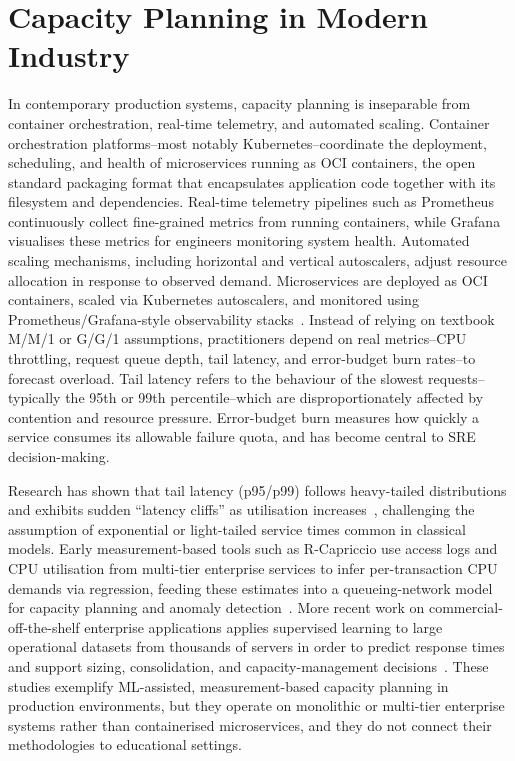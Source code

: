 \section{Capacity Planning in Modern Industry}

In contemporary production systems, capacity planning is inseparable from container orchestration, real-time telemetry, and automated scaling. Container orchestration platforms--most notably Kubernetes--coordinate the deployment, scheduling, and health of microservices running as OCI containers, the open standard packaging format that encapsulates application code together with its filesystem and dependencies. Real-time telemetry pipelines such as Prometheus continuously collect fine-grained metrics from running containers, while Grafana visualises these metrics for engineers monitoring system health. Automated scaling mechanisms, including horizontal and vertical autoscalers, adjust resource allocation in response to observed demand. Microservices are deployed as OCI containers, scaled via Kubernetes autoscalers, and monitored using Prometheus/Grafana-style observability stacks~\cite{Burns2016,GoogleSRE2020}. Instead of relying on textbook M/M/1 or G/G/1 assumptions, practitioners depend on real metrics--CPU throttling, request queue depth, tail latency, and error-budget burn rates--to forecast overload. Tail latency refers to the behaviour of the slowest requests--typically the 95th or 99th percentile--which are disproportionately affected by contention and resource pressure. Error-budget burn measures how quickly a service consumes its allowable failure quota, and has become central to SRE decision-making.

Research has shown that tail latency (p95/p99) follows heavy-tailed distributions and exhibits sudden ``latency cliffs'' as utilisation increases~\cite{DeanBarroso2013}, challenging the assumption of exponential or light-tailed service times common in classical models. Early measurement-based tools such as R-Capriccio use access logs and CPU utilisation from multi-tier enterprise services to infer per-transaction CPU demands via regression, feeding these estimates into a queueing-network model for capacity planning and anomaly detection~\cite{Zhang2007RCapriccio}. More recent work on commercial-off-the-shelf enterprise applications applies supervised learning to large operational datasets from thousands of servers in order to predict response times and support sizing, consolidation, and capacity-management decisions~\cite{Mueller2022ITCapacityML}. These studies exemplify ML-assisted, measurement-based capacity planning in production environments, but they operate on monolithic or multi-tier enterprise systems rather than containerised microservices, and they do not connect their methodologies to educational settings.

